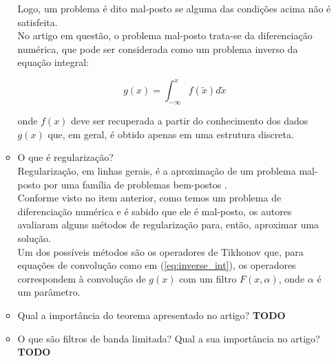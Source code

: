 \documentclass[12pt]{article}
\begin{document}
\begin{itemize}
\begin{itemize}
Logo, um problema é dito mal-posto se alguma das condições acima não é satisfeita.  
\\No artigo em questão, o problema mal-posto trata-se da diferenciação numérica, que pode ser considerada como um problema
inverso da equação integral:

\begin{equation} \label{eq:inverse_int}
   g(x) = \int_{-\infty}^{x} f(\tilde{x}) d\tilde{x}
\end{equation}

onde $f(x)$ deve ser recuperada a partir do conhecimento dos dados $g(x)$ que, em geral, é obtido apenas em uma estrutura discreta.
\\

\item O que é regularização?
\\Regularização, em linhas gerais, é a aproximação de um problema mal-posto por uma família de problemas bem-postos \cite{Engl-1981}.
\\Conforme visto no item anterior, como temos um problema de diferenciação numérica e é sabido que ele é mal-posto, os autores 
avaliaram alguns métodos de regularização para, então, aproximar uma solução.
\\Um dos possíveis métodos são os operadores de Tikhonov que, para equações de convolução como em (\ref{eq:inverse_int}),
os operadores correspondem à convolução de $g(x)$ com um filtro $F(x, \alpha)$, onde $\alpha$ é um parâmetro.
\\

\item Qual a importância do teorema apresentado no artigo?
\textbf{TODO}

\item O que são filtros de banda limitada? Qual a sua importância no artigo?
\textbf{TODO}


\end{itemize}
\end{itemize}
\end{document}
